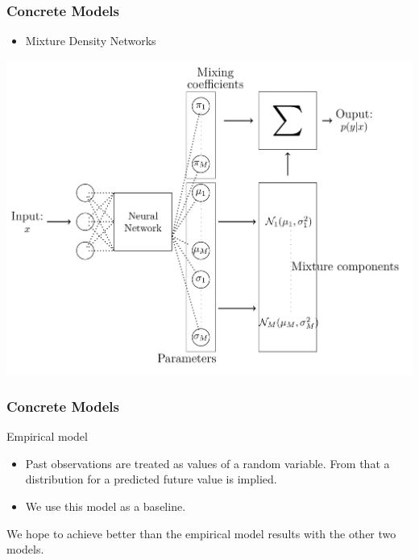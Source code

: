 \documentclass[18pt]{beamer}
\begin{document}
\begin{frame}
  \frametitle{Concrete Models}
  
  \begin{itemize}
  \item Mixture Density Networks
  \end{itemize}

  \begin{center}
    \includegraphics[scale=0.15]{images/mdn}
  \end{center}
  
\end{frame}

\begin{frame}[t]
  \frametitle{Concrete Models}
  Empirical model
  \begin{itemize}
  \item Past observations are treated as values of a random variable. From that a distribution for a predicted future value is implied.
  \item We use this model as a baseline.
  \end{itemize}
  We hope to achieve better than the empirical model results with the other two models.

\end{frame}
\end{document}

